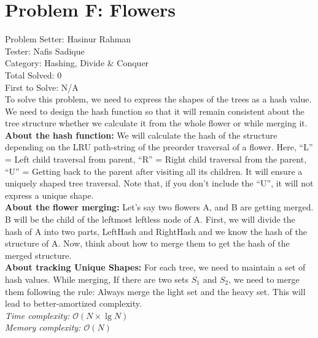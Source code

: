 \section*{Problem F: Flowers}
Problem Setter: Hasinur Rahman \\
Tester: Nafis Sadique \\
Category: Hashing, Divide \& Conquer \\
Total Solved: 0 \\
First to Solve: N/A \\

To solve this problem, we need to express the shapes of the trees as a hash value. We need to design the hash function so that it will remain consistent about the tree structure whether we calculate it from the whole flower or while merging it.\\
\textbf{About the hash function:} We will calculate the hash of the structure depending on the LRU path-string of the preorder traversal of a flower. Here, ``L'' = Left child traversal from parent, ``R'' = Right child traversal from the parent, ``U'' = Getting back to the parent after visiting all its children. It will ensure a uniquely shaped tree traversal. Note that, if you don't include the ``U'', it will not express a unique shape.\\
\textbf{About the flower merging:} Let's say two flowers A, and B are getting merged. B will be the child of the leftmost leftless node of A. First, we will divide the  hash of A into two parts, LeftHash and RightHash and we know the hash of the structure of A. Now, think about how to merge them to get the hash of the merged structure.\\
\textbf{About tracking Unique Shapes:} For each tree, we need to maintain a set of hash values. While merging, If there are two sets $S_{1}$ and $S_{2}$, we need to merge them following the rule: Always merge the light set and the heavy set. This will lead to better-amortized complexity.\\
\textit{Time complexity: $\mathcal{O}(N\times\lg{N})$}\\
\textit{Memory complexity: $\mathcal{O}(N)$}\\